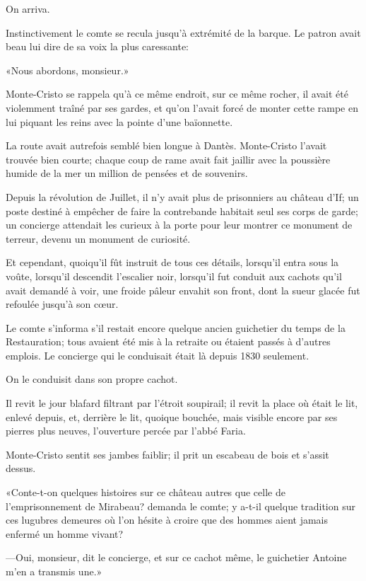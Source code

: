 On arriva. 

Instinctivement le comte se recula jusqu'à extrémité de la barque. Le patron avait beau lui dire de sa voix la plus caressante: 

«Nous abordons, monsieur.» 

Monte-Cristo se rappela qu'à ce même endroit, sur ce même rocher, il avait été violemment traîné par ses gardes, et qu'on l'avait forcé de monter cette rampe en lui piquant les reins avec la pointe d'une baïonnette. 

La route avait autrefois semblé bien longue à Dantès. Monte-Cristo l'avait trouvée bien courte; chaque coup de rame avait fait jaillir avec la poussière humide de la mer un million de pensées et de souvenirs. 

Depuis la révolution de Juillet, il n'y avait plus de prisonniers au château d'If; un poste destiné à empêcher de faire la contrebande habitait seul ses corps de garde; un concierge attendait les curieux à la porte pour leur montrer ce monument de terreur, devenu un monument de curiosité. 

Et cependant, quoiqu'il fût instruit de tous ces détails, lorsqu'il entra sous la voûte, lorsqu'il descendit l'escalier noir, lorsqu'il fut conduit aux cachots qu'il avait demandé à voir, une froide pâleur envahit son front, dont la sueur glacée fut refoulée jusqu'à son cœur. 

Le comte s'informa s'il restait encore quelque ancien guichetier du temps de la Restauration; tous avaient été mis à la retraite ou étaient passés à d'autres emplois. Le concierge qui le conduisait était là depuis 1830 seulement. 

On le conduisit dans son propre cachot. 

Il revit le jour blafard filtrant par l'étroit soupirail; il revit la place où était le lit, enlevé depuis, et, derrière le lit, quoique bouchée, mais visible encore par ses pierres plus neuves, l'ouverture percée par l'abbé Faria. 

Monte-Cristo sentit ses jambes faiblir; il prit un escabeau de bois et s'assit dessus. 

«Conte-t-on quelques histoires sur ce château autres que celle de l'emprisonnement de Mirabeau? demanda le comte; y a-t-il quelque tradition sur ces lugubres demeures où l'on hésite à croire que des hommes aient jamais enfermé un homme vivant? 

—Oui, monsieur, dit le concierge, et sur ce cachot même, le guichetier Antoine m'en a transmis une.» 

